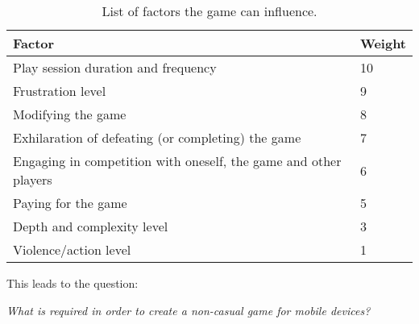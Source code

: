 \begin{table}[h]
\begin{tabular}{|l|l|}
\hline
\rowcolor[HTML]{C0C0C0}
Factor                                                                & Weight \\ \hline
Play session duration and frequency									  & 10     \\ \hline
Frustration level			                                          & 9      \\ \hline
Modifying the game 									                  & 8      \\ \hline
Exhilaration of defeating (or completing) the game 				      & 7      \\ \hline
Engaging in competition with oneself, the game and other players 	  & 6      \\ \hline
Paying for the game          			                              & 5      \\ \hline
Depth and complexity level					                          & 3      \\ \hline
Violence/action level 		                                          & 1      \\ \hline
\end{tabular}
\label{tab:relevantFactors}
\caption{List of factors the game can influence.}
\end{table}



This leads to the question:
\begin{center}\label{intro:problem_statement}
\textit{What is required in order to create a non-casual game for mobile devices?}
\end{center}
